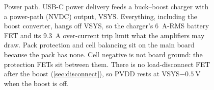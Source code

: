 \begin{figure}[htbp]
\caption{Power path. USB-C power delivery feeds a buck--boost charger with a power-path (NVDC) output, VSYS. Everything, including the boost converter, hangs off VSYS, so the charger's \qty{6}{\ampere}-RMS battery FET and its \qty{9.3}{\ampere} over-current trip limit what the amplifiers may draw. Pack protection and cell balancing sit on the main board because the pack has none. Cell negative is not board ground: the protection FETs sit between them. There is no load-disconnect FET after the boost (\cref{sec:disconnect}), so PVDD rests at VSYS$-\qty{0.5}{\volt}$ when the boost is off.}
\label{fig:power-path}
\end{figure}

